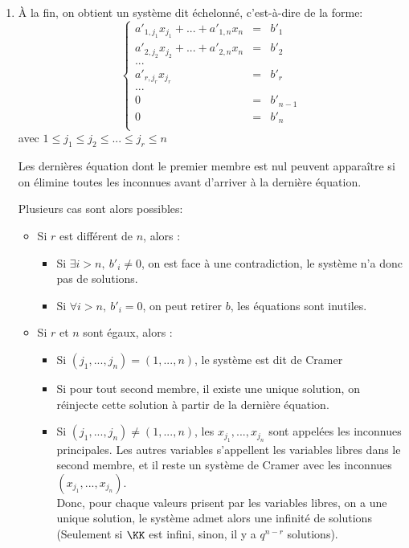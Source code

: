 \documentclass[../main.tex]{subfile}
\begin{document}
\begin{enumerate}
	\item \`A la fin, on obtient un système dit échelonné, c'est-à-dire de la forme:\\
	$$
	\left\{
	\begin{array}{rcl}
		a'_{1, j_1}x_{j_1} + ... + a'_{1, n}x_n &=& b'_1\\
		a'_{2, j_2}x_{j_2} + ... + a'_{2, n}x_n &=& b'_2\\
		...\\
		a'_{r, j_r}x_{j_r} &=& b'_r\\
		...\\
		0 &=& b'_{n-1}\\
		0 &=& b'_n\\
	\end{array}
	\right.
	$$
	avec $1 \leq j_1 \leq j_2 \leq ... \leq j_r \leq n$\\
\begin{rema}	
	Les dernières équation dont le premier membre est nul peuvent apparaître 
	si on élimine toutes les inconnues avant d'arriver à la dernière équation.
\end{rema}
	Plusieurs cas sont alors possibles:
\begin{itemize}	
	\item Si $r$ est différent de $n$, alors :
\begin{itemize}	
	\item Si $\exists i > n, \ b'_i \neq 0$, on est face à une contradiction, 
	le système n'a donc pas de solutions.
	\item Si $\forall i > n, \ b'_i = 0$, on peut retirer $b$, 
	les équations sont inutiles.
\end{itemize}
	\item Si $r$ et $n$ sont égaux, alors :
\begin{itemize}	
	\item Si $(j_1, ..., j_n) = (1, ..., n)$, le système est dit de Cramer
	\item Si pour tout second membre, il existe une unique solution, 
	on réinjecte cette solution à partir de la dernière équation.
	\item Si $(j_1, ..., j_n) \neq (1, ..., n)$, les $x_{j_1}, ..., x_{j_n}$ sont appelées les inconnues principales.
	Les autres variables s'appellent les variables libres dans le second membre, 
	et il reste un système de Cramer avec les inconnues $(x_{j_1}, ..., x_{j_n})$.\\
	Donc, pour chaque valeurs prisent par les variables libres, on a une unique solution, 
	le système admet alors une infinité de solutions (Seulement si $\KK$ est infini, sinon,
	il y a $q^{n-r}$ solutions).
\end{itemize}
\end{itemize}
\end{enumerate}
\end{document}

